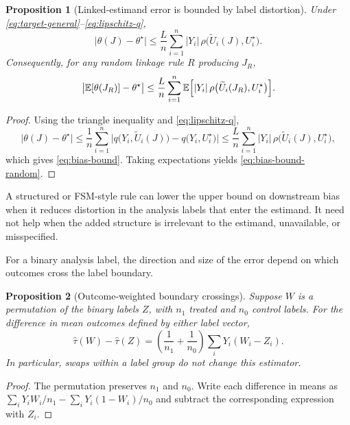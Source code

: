 \documentclass[11pt]{article}
\newtheorem{proposition}{Proposition}[section]
\theoremstyle{remark}
\begin{document}
\begin{proposition}[Linked-estimand error is bounded by label distortion]
\label{prop:bias-bound}
Under \eqref{eq:target-general}--\eqref{eq:lipschitz-q},
\begin{equation}
\bigl|\theta(J)-\theta^\star\bigr|
\le
\frac{L}{n}\sum_{i=1}^n |Y_i|\,\rho\bigl(\widetilde U_i(J),U_i^\star\bigr).
\label{eq:bias-bound}
\end{equation}
Consequently, for any random linkage rule $R$ producing $J_R$,
\begin{equation}
\bigl|\mathbb{E}[\theta(J_R)]-\theta^\star\bigr|
\le
\frac{L}{n}\sum_{i=1}^n \mathbb{E}\Bigl[|Y_i|\,\rho\bigl(\widetilde U_i(J_R),U_i^\star\bigr)\Bigr].
\label{eq:bias-bound-random}
\end{equation}
\end{proposition}

\begin{proof}
Using the triangle inequality and \eqref{eq:lipschitz-q},
\[
\bigl|\theta(J)-\theta^\star\bigr|
\le
\frac{1}{n}\sum_{i=1}^n
\bigl|q\bigl(Y_i,\widetilde U_i(J)\bigr)-q\bigl(Y_i,U_i^\star\bigr)\bigr|
\le
\frac{L}{n}\sum_{i=1}^n |Y_i|\,\rho\bigl(\widetilde U_i(J),U_i^\star\bigr),
\]
which gives \eqref{eq:bias-bound}. Taking expectations yields \eqref{eq:bias-bound-random}.
\end{proof}

A structured or FSM-style rule can lower the upper bound on downstream bias when it reduces distortion in the analysis labels that enter the estimand. It need not help when the added structure is irrelevant to the estimand, unavailable, or misspecified.

For a binary analysis label, the direction and size of the error depend on which outcomes cross the label boundary.

\begin{proposition}[Outcome-weighted boundary crossings]
\label{prop:boundary}
Suppose $W$ is a permutation of the binary labels $Z$, with $n_1$ treated and $n_0$ control labels. For the difference in mean outcomes defined by either label vector,
\begin{equation}
\hat\tau(W)-\hat\tau(Z)
=\left(\frac{1}{n_1}+\frac{1}{n_0}\right)
\sum_i Y_i(W_i-Z_i).
\label{eq:boundary-identity}
\end{equation}
In particular, swaps within a label group do not change this estimator.
\end{proposition}

\begin{proof}
The permutation preserves $n_1$ and $n_0$. Write each difference in means as
$\sum_i Y_i W_i/n_1-\sum_i Y_i(1-W_i)/n_0$ and subtract the corresponding expression with $Z_i$.
\end{proof}
\end{document}
